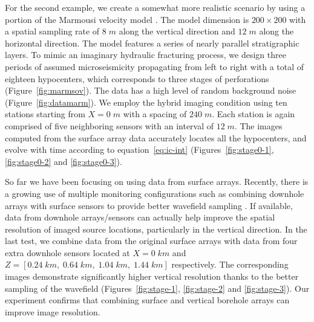 For the second example, we create a somewhat more realistic scenario by using a portion of the Marmousi velocity model \cite[]{marmousi}. The model dimension is $200 \times 200$ with a spatial sampling rate of $8\;m$ along the vertical direction and $12\;m$ along the horizontal direction. The model features a series of nearly parallel stratigraphic layers. To mimic an imaginary hydraulic fracturing process, we design three periods of assumed microseismicity propagating from left to right with a total of eighteen hypocenters, which corresponds to three stages of perforations (Figure~\ref{fig:marmsov}). The data has a high level of random background noise (Figure~\ref{fig:datamarm}). We employ the hybrid imaging condition using ten stations starting from $X=0\;m$ with a spacing of $240\;m$. Each station is again comprised of five neighboring sensors with an interval of $12\;m$. The images computed from the surface array data accurately locates all the hypocenters, and evolve with time according to equation~\ref{eq:ic-int} (Figures~\ref{fig:stage0-1}, \ref{fig:stage0-2} and \ref{fig:stage0-3}).


So far we have been focusing on using data from surface arrays. Recently, there is a growing use of multiple monitoring configurations such as combining downhole arrays with surface sensors to provide better wavefield sampling \cite[]{maxwellbook}. If available, data from downhole arrays/sensors can actually help improve the spatial resolution of imaged source locations, particularly in the vertical direction. In the last test, we combine data from the original surface arrays with data from four extra downhole sensors located at $X=0\;km$ and $Z=[0.24\;km,\;0.64\;km,\;1.04\;km,\;1.44\;km]$ respectively. The corresponding images demonstrate significantly higher vertical resolution thanks to the better sampling of the wavefield (Figures~\ref{fig:stage-1}, \ref{fig:stage-2} and \ref{fig:stage-3}). Our experiment confirms that combining surface and vertical borehole arrays can improve image resolution.

